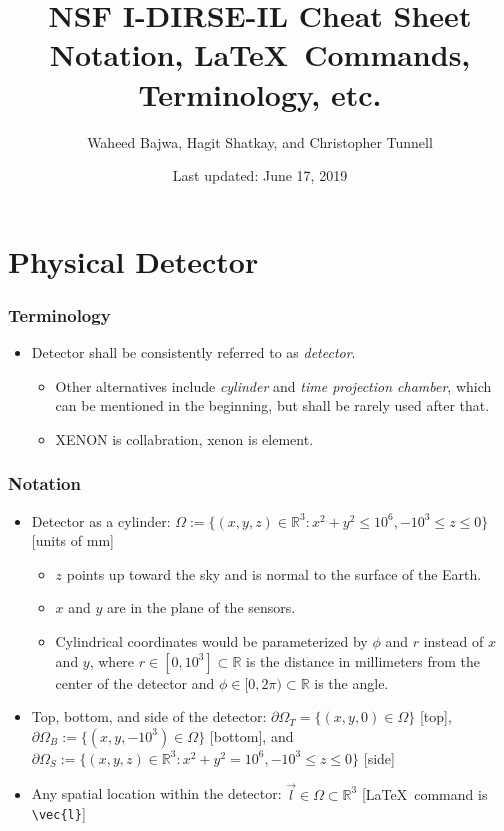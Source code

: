 \documentclass[]{article}
\title{NSF I-DIRSE-IL Cheat Sheet\\
        Notation, \LaTeX~Commands, Terminology, etc.}
\author{Waheed Bajwa, Hagit Shatkay, and Christopher Tunnell}
\date{Last updated: June 17, 2019}
\providecommand{\tightlist}{%
  \setlength{\itemsep}{0pt}\setlength{\parskip}{0pt}}
\begin{document}
\maketitle


\section{Physical Detector}

\subsubsection{Terminology}

\begin{itemize}
\tightlist
\item
  Detector shall be consistently referred to as \emph{detector}.
  \begin{itemize}
  \tightlist
  \item
    Other alternatives include \emph{cylinder} and \emph{time projection chamber}, which can be mentioned in the beginning, but shall be rarely used after that.
    \item XENON is collabration, xenon is element.
  \end{itemize}
\end{itemize}

\subsubsection{Notation}

\begin{itemize}
\tightlist
\item
  Detector as a cylinder:
  \(\Omega := \{(x,y,z) \in \mathbb{R}^3: x^2 + y^2 \leq 10^6, -10^3 \leq z \leq 0\}\)
  {[}units of mm{]}

  \begin{itemize}
  \tightlist
  \item
    $z$ points up toward the sky and is normal to the surface of the Earth.
  \item
    $x$ and $y$ are in the plane of the sensors.
  \item
    Cylindrical coordinates would be parameterized by $\phi$ and $r$ instead of $x$ and $y$, where $r \in [0, 10^3] \subset \mathbb{R}$ is the distance in millimeters from the center of the detector and $\phi \in [0, 2\pi) \subset \mathbb{R}$ is the angle.
  \end{itemize}
\item
  Top, bottom, and side of the detector:
  \(\partial\Omega_T = \{(x,y,0) \in \Omega\}\) {[}top{]},
  \(\partial\Omega_B := \{(x,y,-10^3) \in \Omega\}\) {[}bottom{]}, and
  \(\partial\Omega_S := \{(x,y,z) \in \mathbb{R}^3: x^2 + y^2 = 10^6, -10^3 \leq z \leq 0 \}\) {[}side{]}
\item
  Any spatial location within the detector:
  \(\vec{l} \in \Omega \subset \mathbb{R}^3\) {[}{\color{blue}\LaTeX~command is \verb|\vec{l}|}{]}
\end{itemize}
\end{document}
